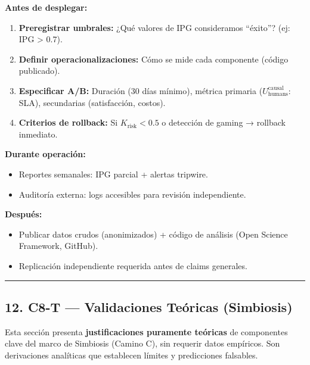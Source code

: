 \textbf{Antes de desplegar:}

\begin{enumerate}
\def\labelenumi{\arabic{enumi}.}
\tightlist
\item
  \textbf{Preregistrar umbrales:} ¿Qué valores de \(\mathrm{IPG}\)
  consideramos ``éxito''? (ej: IPG \textgreater{} 0.7).
\item
  \textbf{Definir operacionalizaciones:} Cómo se mide cada componente
  (código publicado).
\item
  \textbf{Especificar A/B:} Duración (30 días mínimo), métrica primaria
  (\(U_{\text{humans}}^{\text{causal}}\): SLA), secundarias
  (satisfacción, costos).
\item
  \textbf{Criterios de rollback:} Si \(K_{\text{risk}} < 0.5\) o
  detección de gaming → rollback inmediato.
\end{enumerate}

\textbf{Durante operación:}

\begin{itemize}
\tightlist
\item
  Reportes semanales: \(\mathrm{IPG}\) parcial + alertas tripwire.
\item
  Auditoría externa: logs accesibles para revisión independiente.
\end{itemize}

\textbf{Después:}

\begin{itemize}
\tightlist
\item
  Publicar datos crudos (anonimizados) + código de análisis (Open
  Science Framework, GitHub).
\item
  Replicación independiente requerida antes de claims generales.
\end{itemize}

\begin{center}\rule{0.5\linewidth}{0.5pt}\end{center}

\subsection{12. C8-T --- Validaciones Teóricas
(Simbiosis)}\label{c8-t-validaciones-teuxf3ricas-simbiosis}

Esta sección presenta \textbf{justificaciones puramente teóricas} de
componentes clave del marco de Simbiosis (Camino C), sin requerir datos
empíricos. Son derivaciones analíticas que establecen límites y
predicciones falsables.


